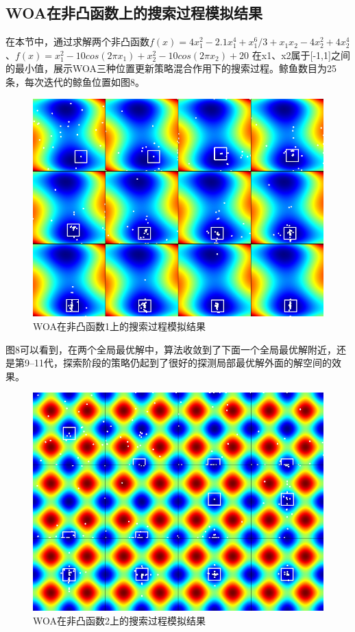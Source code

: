 \documentclass[12pt,a4paper]{article}
\begin{document}
\subsection{WOA在非凸函数上的搜索过程模拟结果}
在本节中，通过求解两个非凸函数$f(x)=4x_1^2-2.1x_1^4+x_1^6/3+x_1x_2-4x_2^2+4x_2^4$ 、$f(x)=x_1^2-10cos(2\pi x_1)+x_2^2-10cos(2\pi x_2)+20$ 在x1、x2属于[-1,1]之间的最小值，展示WOA三种位置更新策略混合作用下的搜索过程。鲸鱼数目为25条，每次迭代的鲸鱼位置如图8。
\begin{figure}[H]
\centering
\includegraphics[width=1.0\textwidth]{figure/d.png}
\renewcommand\figurename{图}\caption{WOA在非凸函数1上的搜索过程模拟结果}
\end{figure}

图8可以看到，在两个全局最优解中，算法收敛到了下面一个全局最优解附近，还是第9--11代，探索阶段的策略仍起到了很好的探测局部最优解外面的解空间的效果。
\begin{figure}[H]
\centering
\includegraphics[width=1.0\textwidth]{figure/e.png}
\renewcommand\figurename{图}\caption{WOA在非凸函数2上的搜索过程模拟结果}
\end{figure}
\end{document}
